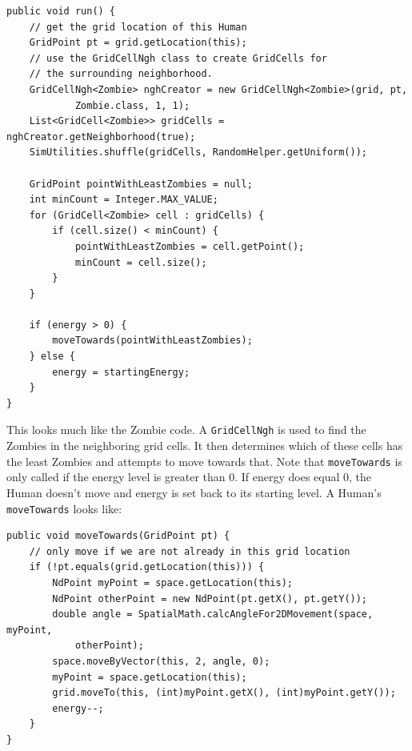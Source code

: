 \documentclass[11pt]{amsart}
\begin{document}
\noindent\begin{minipage}[h]{\textwidth}
\vspace{.2in}
\lstset{language=java,caption=The Run Method}
\begin{lstlisting}
public void run() {
	// get the grid location of this Human
	GridPoint pt = grid.getLocation(this);
	// use the GridCellNgh class to create GridCells for
	// the surrounding neighborhood.
	GridCellNgh<Zombie> nghCreator = new GridCellNgh<Zombie>(grid, pt,
			Zombie.class, 1, 1);
	List<GridCell<Zombie>> gridCells = nghCreator.getNeighborhood(true);
	SimUtilities.shuffle(gridCells, RandomHelper.getUniform());

	GridPoint pointWithLeastZombies = null;
	int minCount = Integer.MAX_VALUE;
	for (GridCell<Zombie> cell : gridCells) {
		if (cell.size() < minCount) {
			pointWithLeastZombies = cell.getPoint();
			minCount = cell.size();
		}
	}
	
	if (energy > 0) {
		moveTowards(pointWithLeastZombies);
	} else {
		energy = startingEnergy;
	}
}
\end{lstlisting}
\vspace{.2in}
\end{minipage}

This looks much like the Zombie code. A \texttt{GridCellNgh} is used to find the Zombies in the neighboring grid cells. It then determines which of these cells has the least Zombies and attempts to move towards that. Note that \texttt{moveTowards} is only called if the energy level is greater than 0. If energy does equal 0, the Human doesn't move and energy is set back to its starting level. A Human's \texttt{moveTowards} looks like:

\noindent\begin{minipage}[h]{\textwidth}
\vspace{.2in}
\lstset{language=java,caption=}
\begin{lstlisting}
public void moveTowards(GridPoint pt) {
	// only move if we are not already in this grid location
	if (!pt.equals(grid.getLocation(this))) {
		NdPoint myPoint = space.getLocation(this);
		NdPoint otherPoint = new NdPoint(pt.getX(), pt.getY());
		double angle = SpatialMath.calcAngleFor2DMovement(space, myPoint, 
			otherPoint);
		space.moveByVector(this, 2, angle, 0);
		myPoint = space.getLocation(this);
		grid.moveTo(this, (int)myPoint.getX(), (int)myPoint.getY());
		energy--;
	}
}
\end{lstlisting}
\vspace{.2in}
\end{minipage}
\end{document}
